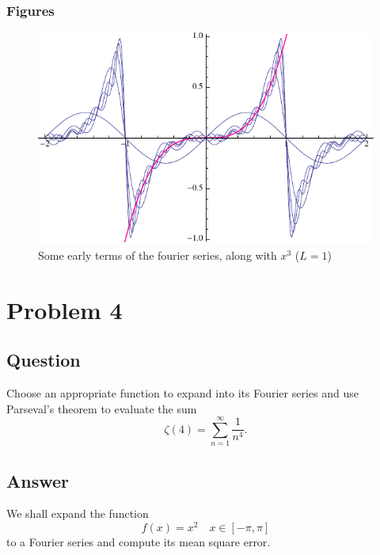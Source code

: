 \documentclass[12pt]{article}
\begin{document}
\subsubsection{Figures}
\begin{figure}[htp]
\centering
\includegraphics{fourierseriesfigure.pdf}
\caption{Some early terms of the fourier series, along with $x^3$ ($L=1$)}\label{fig:fsf}
\end{figure}


\section{Problem 4}
\subsection{Question}
Choose an appropriate function to expand into its Fourier series and use Parseval's theorem to evaluate the sum
\[\zeta(4)=\sum_{n=1}^\infty \frac{1}{n^4}.\]

\subsection{Answer}
We shall expand the function
\[f(x) = x^2 \quad x\in[-\pi,\pi]\]
to a Fourier series and compute its mean square error.
\end{document}

